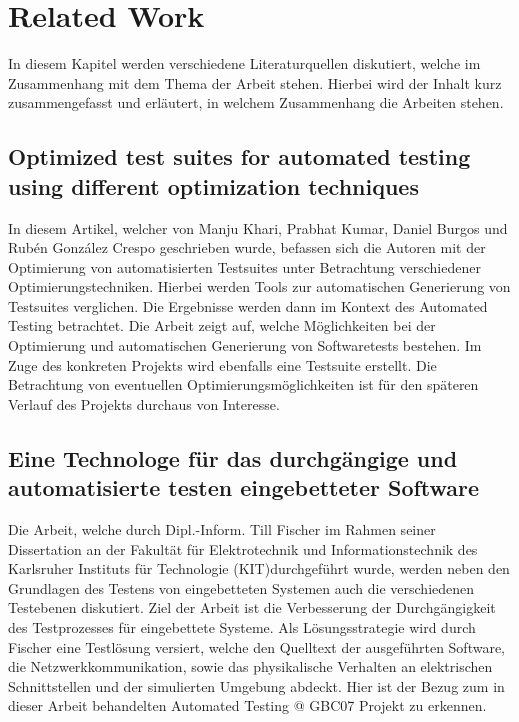 \onehalfspacing
\section{Related Work}
In diesem Kapitel werden verschiedene Literaturquellen diskutiert, welche im Zusammenhang mit dem Thema der Arbeit stehen. Hierbei wird der Inhalt kurz zusammengefasst und erläutert, in welchem Zusammenhang die Arbeiten stehen.
\subsection*{Optimized test suites for automated testing using different optimization techniques}
In diesem Artikel, welcher von Manju Khari, Prabhat Kumar, Daniel Burgos und Rubén González Crespo geschrieben wurde, befassen sich die Autoren mit der Optimierung von automatisierten Testsuites unter Betrachtung verschiedener Optimierungstechniken. Hierbei werden Tools zur automatischen Generierung von Testsuites verglichen. Die Ergebnisse werden dann im Kontext des Automated Testing betrachtet. Die Arbeit zeigt auf, welche Möglichkeiten bei der Optimierung und automatischen Generierung von Softwaretests bestehen. Im Zuge des konkreten Projekts wird ebenfalls eine Testsuite erstellt. Die Betrachtung von eventuellen Optimierungsmöglichkeiten ist für den späteren Verlauf des Projekts durchaus von Interesse.\cite{ManjuKhariPrabhatKumarDanielBurgosRubenGonzalezCrespo.2017}

\subsection*{Eine Technologe für das durchgängige und automatisierte testen eingebetteter Software}
Die Arbeit, welche durch Dipl.-Inform. Till Fischer im Rahmen seiner Dissertation an der Fakultät für Elektrotechnik und Informationstechnik des Karlsruher Instituts für Technologie (KIT)durchgeführt wurde, werden neben den Grundlagen des Testens von eingebetteten Systemen auch die verschiedenen Testebenen diskutiert. Ziel der Arbeit ist die Verbesserung der Durchgängigkeit des Testprozesses für eingebettete Systeme. Als Lösungsstrategie wird durch Fischer eine Testlösung versiert, welche den Quelltext der ausgeführten Software, die Netzwerkkommunikation, sowie das physikalische Verhalten an elektrischen Schnittstellen und der simulierten Umgebung abdeckt. Hier ist der Bezug zum in dieser Arbeit behandelten Automated Testing @ GBC07 Projekt zu erkennen. \cite{Dipl.Inform.TillFischer.2016}


